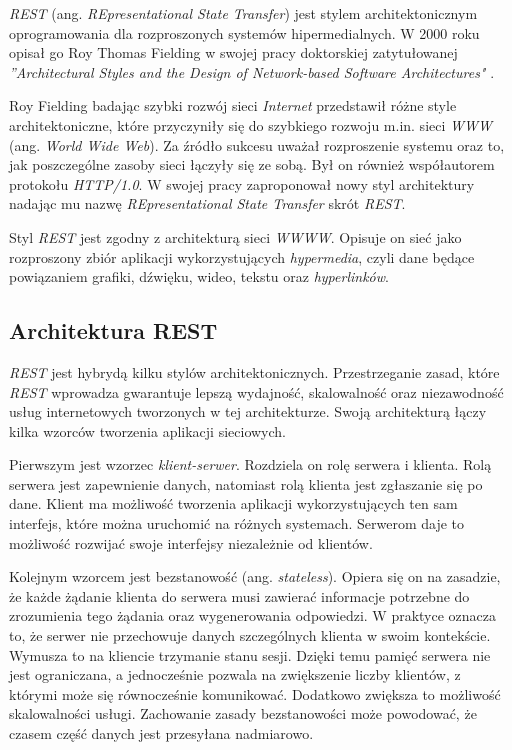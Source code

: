 \textsl{REST} (ang. \textsl{REpresentational State Transfer}) jest stylem architektonicznym oprogramowania dla rozproszonych systemów hipermedialnych. W 2000 roku opisał go Roy Thomas Fielding w swojej pracy doktorskiej zatytułowanej \textsl{''Architectural Styles and the Design of Network-based Software Architectures"} \cite{restinpractice}.

Roy Fielding badając  szybki rozwój sieci \textsl{Internet} przedstawił różne style architektoniczne, które przyczyniły się do szybkiego rozwoju m.in. sieci \textsl{WWW} (ang. \textsl{World Wide Web}). Za źródło sukcesu  uważał rozproszenie systemu oraz to, jak poszczególne zasoby sieci łączyły się ze sobą. Był on również współautorem protokołu \textsl{HTTP/1.0}. W swojej pracy zaproponował nowy styl architektury nadając mu nazwę \textsl{REpresentational State Transfer} skrót \textsl{REST}.

Styl \textsl{REST} jest  zgodny z architekturą sieci \textsl{WWWW}. Opisuje on sieć jako rozproszony zbiór aplikacji wykorzystujących \textsl{hypermedia}, czyli dane będące powiązaniem grafiki, dźwięku, wideo, tekstu oraz \textsl{hyperlinków}. 

\subsection{Architektura REST}
\textsl{REST} jest hybrydą kilku stylów architektonicznych. Przestrzeganie zasad, które \textsl{REST} wprowadza gwarantuje lepszą wydajność, skalowalność oraz niezawodność usług internetowych tworzonych w tej architekturze. Swoją architekturą łączy kilka wzorców tworzenia aplikacji sieciowych. 

Pierwszym  jest wzorzec \textsl{klient-serwer}. Rozdziela on rolę serwera i klienta. Rolą serwera jest zapewnienie danych, natomiast rolą klienta jest zgłaszanie się po dane. Klient ma możliwość tworzenia aplikacji wykorzystujących ten sam interfejs, które można uruchomić na różnych systemach. Serwerom daje to możliwość rozwijać swoje interfejsy niezależnie od klientów. 

Kolejnym wzorcem jest bezstanowość (ang. \textsl{stateless}). Opiera się on na zasadzie, że każde żądanie klienta do serwera musi zawierać informacje potrzebne do zrozumienia tego żądania oraz wygenerowania odpowiedzi. W praktyce oznacza to, że serwer nie przechowuje danych szczególnych klienta w swoim kontekście. Wymusza to na kliencie trzymanie stanu sesji. Dzięki temu pamięć serwera nie jest ograniczana, a jednocześnie pozwala na zwiększenie liczby klientów, z którymi może się równocześnie komunikować. Dodatkowo zwiększa to możliwość skalowalności usługi. Zachowanie zasady bezstanowości może powodować, że czasem część danych jest przesyłana nadmiarowo.

